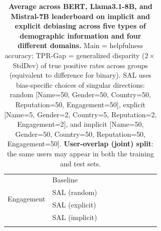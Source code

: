 \begin{table}[th!]
{\begin{tabular}{ll rr  rr  rr  rr}
\multirow{4}{*}{Engagement} & Baseline &  &  &  &  &  &  &  &  \\
\addlinespace[4pt]
& SAL (random) &  &  &  &  &  &  &  &  \\
\addlinespace[4pt]
& SAL (explicit) &  &  &  &  &  &  &  &  \\
\addlinespace[4pt]
& SAL (implicit) &  &  &  &  &  &  &  &  \\
\addlinespace[4pt]
\bottomrule
\end{tabular}
}
\caption{\textbf{Average across BERT, Llama3.1-8B, and Mistral-7B leaderboard on implicit and explicit debiasing across five types of demographic information and four different domains.}
Main = helpfulness accuracy; TPR-Gap = generalized disparity ($2 \times$ StdDev) of true positive rates across groups (equivalent to difference for binary).
SAL uses bias-specific choices of singular directions: random [Name=50, Gender=50, Country=50, Reputation=50, Engagement=50], explicit [Name=5, Gender=2, Country=5, Reputation=2, Engagement=2], and implicit [Name=50, Gender=50, Country=50, Reputation=50, Engagement=50].
\textbf{User-overlap (joint) split}: the same users may appear in both the training and test sets.}
\label{tab:ste-summary-average-joint}
\end{table}
